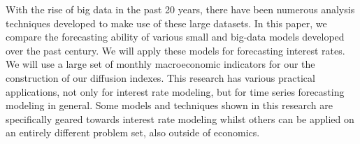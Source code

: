 With the rise of big data in the past 20 years, there have been numerous analysis techniques developed to make use of these large datasets. 
In this paper, we compare the forecasting ability of various small and big-data models developed over the past century. 
We will apply these models for forecasting interest rates. 
We will use a large set of monthly macroeconomic indicators for our the construction of our diffusion indexes. 
This research has various practical applications, not only for interest rate modeling, but for time series forecasting modeling in general. 
Some models and techniques shown in this research are specifically geared towards interest rate modeling whilst others can be applied on an entirely different problem set, also outside of economics. 
